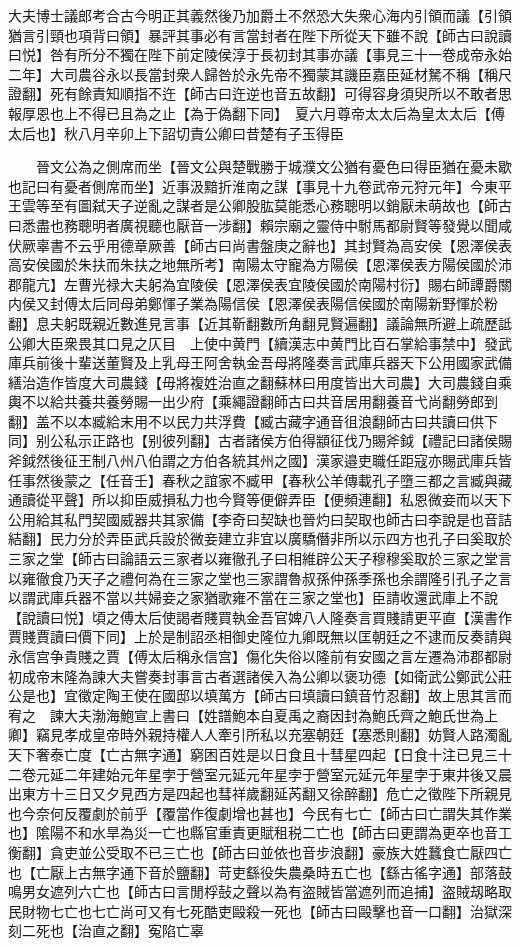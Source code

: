 大夫博士議郎考合古今明正其義然後乃加爵土不然恐大失衆心海内引領而議【引領猶言引頸也項背曰領】暴評其事必有言當封者在陛下所從天下雖不說【師古曰說讀曰悦】咎有所分不獨在陛下前定陵侯淳于長初封其事亦議【事見三十一卷成帝永始二年】大司農谷永以長當封衆人歸咎於永先帝不獨蒙其譏臣嘉臣延材駑不稱【稱尺證翻】死有餘責知順指不迕【師古曰迕逆也音五故翻】可得容身須臾所以不敢者思報厚恩也上不得已且為之止【為于偽翻下同】　夏六月尊帝太太后為皇太太后【傅太后也】秋八月辛卯上下詔切責公卿曰昔楚有子玉得臣

　　晉文公為之側席而坐【晉文公與楚戰勝于城濮文公猶有憂色曰得臣猶在憂未歇也記曰有憂者側席而坐】近事汲黯折淮南之謀【事見十九卷武帝元狩元年】今東平王雲等至有圖弑天子逆亂之謀者是公卿股肱莫能悉心務聰明以銷厭未萌故也【師古曰悉盡也務聰明者廣視聽也厭音一涉翻】賴宗廟之靈侍中駙馬都尉賢等發覺以聞咸伏厥辜書不云乎用德章厥善【師古曰尚書盤庚之辭也】其封賢為高安侯【恩澤侯表高安侯國於朱扶而朱扶之地無所考】南陽太守寵為方陽侯【恩澤侯表方陽侯國於沛郡龍亢】左曹光禄大夫躬為宜陵侯【恩澤侯表宜陵侯國於南陽村衍】賜右師譚爵關内侯又封傅太后同母弟鄭惲子業為陽信侯【恩澤侯表陽信侯國於南陽新野惲於粉翻】息夫躬既親近數進見言事【近其靳翻數所角翻見賢遍翻】議論無所避上疏歷詆公卿大臣衆畏其口見之仄目　上使中黄門【續漢志中黄門比百石掌給事禁中】發武庫兵前後十輩送董賢及上乳母王阿舍執金吾母將隆奏言武庫兵器天下公用國家武備繕治造作皆度大司農錢【毋將複姓治直之翻蘇林曰用度皆出大司農】大司農錢自乘輿不以給共養共養勞賜一出少府【乘繩證翻師古曰共音居用翻養音弋尚翻勞郎到翻】盖不以本臧給末用不以民力共浮費【臧古藏字通音徂浪翻師古曰共讀曰供下同】别公私示正路也【别彼列翻】古者諸侯方伯得顓征伐乃賜斧鉞【禮記曰諸侯賜斧鉞然後征王制八州八伯謂之方伯各統其州之國】漢家邉吏職任距寇亦賜武庫兵皆任事然後蒙之【任音壬】春秋之誼家不臧甲【春秋公羊傳載孔子墮三都之言臧與藏通讀從平聲】所以抑臣威損私力也今賢等便僻弄臣【便頻連翻】私恩微妾而以天下公用給其私門契國威器共其家備【李奇曰契缺也晉灼曰契取也師古曰李說是也音詰結翻】民力分於弄臣武兵設於微妾建立非宜以廣驕僭非所以示四方也孔子曰奚取於三家之堂【師古曰論語云三家者以雍徹孔子曰相維辟公天子穆穆奚取於三家之堂言以雍徹食乃天子之禮何為在三家之堂也三家謂魯叔孫仲孫季孫也余謂隆引孔子之言以謂武庫兵器不當以共婦妾之家猶歌雍不當在三家之堂也】臣請收還武庫上不說【說讀曰悦】頃之傅太后使謁者賤買執金吾官婢八人隆奏言買賤請更平直【漢書作賈賤賈讀曰價下同】上於是制詔丞相御史隆位九卿既無以匡朝廷之不逮而反奏請與永信宫争貴賤之賈【傅太后稱永信宫】傷化失俗以隆前有安國之言左遷為沛郡都尉初成帝末隆為諫大夫嘗奏封事言古者選諸侯入為公卿以褒功德【如衛武公鄭武公莊公是也】宜徵定陶王使在國邸以填萬方【師古曰填讀曰鎮音竹忍翻】故上思其言而宥之　諫大夫渤海鮑宣上書曰【姓譜鮑本自夏禹之裔因封為鮑氏齊之鮑氏世為上卿】竊見孝成皇帝時外親持權人人牽引所私以充塞朝廷【塞悉則翻】妨賢人路濁亂天下奢泰亡度【亡古無字通】窮困百姓是以日食且十彗星四起【日食十注已見三十二卷元延二年建始元年星孛于營室元延元年星孛于營室元延元年星孛于東井後又晨出東方十三日又夕見西方是四起也彗祥歲翻延芮翻又徐醉翻】危亡之徵陛下所親見也今奈何反覆劇於前乎【覆當作復劇增也甚也】今民有七亡【師古曰亡謂失其作業也】隂陽不和水旱為災一亡也縣官重責更賦租税二亡也【師古曰更謂為更卒也音工衡翻】貪吏並公受取不已三亡也【師古曰並依也音步浪翻】豪族大姓蠶食亡厭四亡也【亡厭上古無字通下音於鹽翻】苛吏繇役失農桑時五亡也【繇古徭字通】部落鼓鳴男女遮列六亡也【師古曰言閒桴鼔之聲以為有盗賊皆當遮列而追捕】盗賊刼略取民財物七亡也七亡尚可又有七死酷吏毆殺一死也【師古曰毆擊也音一口翻】治獄深刻二死也【治直之翻】寃陷亡辜

